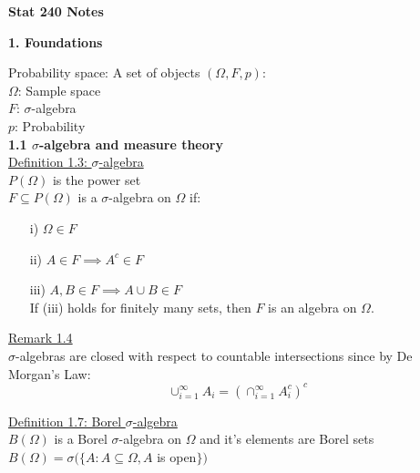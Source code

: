 \documentclass[10pt,letterpaper]{article}
\begin{document}
\noindent \begin{center}
\textbf{\large{}Stat 240 Notes}\vspace{5mm}
\par\end{center}{\large \par}

\begin{center}
\textbf{1. Foundations}
\end{center}

Probability space: A set of objects $(\Omega, F, p)$:\\

$\Omega$: Sample space\\

$F$: $\sigma $-algebra\\

$p$: Probability\\

\textbf{1.1 $\sigma$-algebra and measure theory}\\

\underline{Definition 1.3: $\sigma$-algebra}\\

$P(\Omega)$ is the power set\\

$F\subseteq P(\Omega)$ is a $\sigma$-algebra on $\Omega$ if:

\begin{enumerate}
\item[i)] $\Omega \in F$
\item[ii)] $A\in F\implies A^c\in F$
\item[iii)] $A, B\in F\implies A\cup B\in F$\\
If (iii) holds for finitely many sets, then $F$ is an algebra on $\Omega$.
\end{enumerate}

\underline{Remark 1.4}\\

$\sigma$-algebras are closed with respect to countable intersections since by De Morgan's Law:
$$\cup_{i=1}^{\infty}A_i = (\cap_{i=1}^{\infty}A_i^c)^c$$

\underline{Definition 1.7: Borel $\sigma$-algebra}\\

$B(\Omega)$ is a Borel $\sigma$-algebra on $\Omega$ and it's elements are Borel sets\\

$B(\Omega) = \sigma (\{A: A\subseteq\Omega, A$ is open$\})$\\
\end{document}
